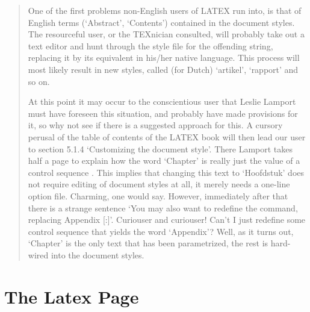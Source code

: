\begin{quotation}
One of the first problems non-English users of LATEX run into, is that of English terms (‘Abstract’,
‘Contents’) contained in the document styles. The resourceful user, or the TEXnician consulted, will
probably take out a text editor and hunt through the style file for the offending string, replacing it by
its equivalent in his/her native language. This process will most likely result in new styles, called (for
Dutch) ‘artikel’, ‘rapport’ and so on.

At this point it may occur to the conscientious user that Leslie Lamport must have foreseen this situation,
and probably have made provisions for it, so why not see if there is a suggested approach for this.
A cursory perusal of the table of contents of the LATEX book will then lead our user to section 5.1.4
‘Customizing the document style’. There Lamport takes half a page to explain how the word ‘Chapter’
is really just the value of a control sequence . This implies that changing this text to
‘Hoofdstuk’ does not require editing of document styles at all, it merely needs a one-line option file.
Charming, one would say. However, immediately after that there is a strange sentence ‘You may also
want to redefine the  command, replacing Appendix [:]’. Curiouser and curiouser!
Can’t I just redefine some control sequence that yields the word ‘Appendix’? Well, as it turns out,
‘Chapter’ is the only text that has been parametrized, the rest is hard-wired into the document styles.
\end{quotation}

\section{The Latex Page}

